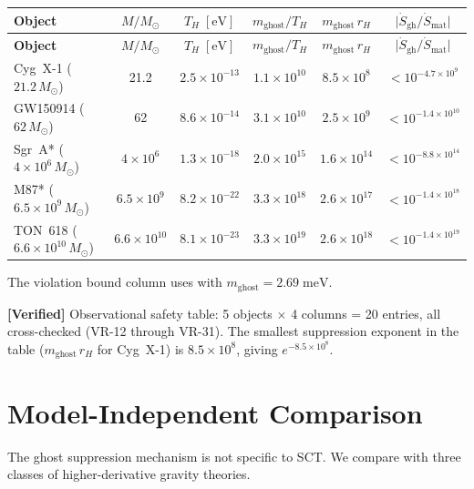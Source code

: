 \documentclass[11pt,a4paper]{article}
\newcommand{\Msun}{M_{\odot}}
\newcommand{\mghost}{m_{\mathrm{ghost}}}
\newcommand{\Thr}{T_{\!\scriptscriptstyle H}}
\theoremstyle{plain}
\theoremstyle{definition}
\newcommand{\verified}[1]{%
  \par\smallskip\noindent
  \colorbox{green!10}{\parbox{\dimexpr\linewidth-2\fboxsep}{%
    \textcolor{green!50!black}{\textbf{[Verified]}} #1}}%
  \par\smallskip}
\begin{document}
\begin{center}
\small
\setlength{\tabcolsep}{4pt}
\begin{longtable}{@{}lccccc@{}}
\toprule
\textbf{Object} & $M/\Msun$ & $\Thr\;[\mathrm{eV}]$
  & $\mghost/\Thr$ & $\mghost\,r_H$
  & $\lvert\dot S_{\mathrm{gh}}/\dot S_{\mathrm{mat}}\rvert$ \\
\midrule
\endfirsthead
\toprule
\textbf{Object} & $M/\Msun$ & $\Thr\;[\mathrm{eV}]$
  & $\mghost/\Thr$ & $\mghost\,r_H$
  & $\lvert\dot S_{\mathrm{gh}}/\dot S_{\mathrm{mat}}\rvert$ \\
\midrule
\endhead
Cyg~X-1 ($21.2\,\Msun$)
  & 21.2 & $2.5\times 10^{-13}$ & $1.1\times 10^{10}$
  & $8.5\times 10^{8}$
  & $< 10^{-4.7\times 10^{9}}$ \\[2pt]
GW150914 ($62\,\Msun$)
  & 62   & $8.6\times 10^{-14}$ & $3.1\times 10^{10}$
  & $2.5\times 10^{9}$
  & $< 10^{-1.4\times 10^{10}}$ \\[2pt]
Sgr~A* ($4\times 10^6\,\Msun$)
  & $4\times 10^6$ & $1.3\times 10^{-18}$
  & $2.0\times 10^{15}$ & $1.6\times 10^{14}$
  & $< 10^{-8.8\times 10^{14}}$ \\[2pt]
M87* ($6.5\times 10^9\,\Msun$)
  & $6.5\times 10^9$ & $8.2\times 10^{-22}$
  & $3.3\times 10^{18}$ & $2.6\times 10^{17}$
  & $< 10^{-1.4\times 10^{18}}$ \\[2pt]
TON~618 ($6.6\times 10^{10}\,\Msun$)
  & $6.6\times 10^{10}$ & $8.1\times 10^{-23}$
  & $3.3\times 10^{19}$ & $2.6\times 10^{18}$
  & $< 10^{-1.4\times 10^{19}}$ \\
\bottomrule
\end{longtable}
\end{center}

The violation bound column uses  with
$\mghost = 2.69\;\mathrm{meV}$.

\verified{Observational safety table: 5 objects $\times$ 4 columns
= 20 entries, all cross-checked (VR-12 through VR-31).  The smallest
suppression exponent in the table ($\mghost\,r_H$ for Cyg~X-1) is
$8.5 \times 10^{8}$, giving $e^{-8.5\times 10^{8}}$.}


\section{Model-Independent Comparison}\label{sec:comparison}

The ghost suppression mechanism is not specific to SCT.  We compare
with three classes of higher-derivative gravity theories.
\end{document}
